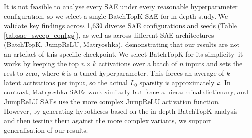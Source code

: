 It is not feasible to analyse every SAE under every reasonable hyperparameter configuration, so we select a single BatchTopK SAE for in-depth study. We validate key findings across 1,630 diverse SAE configurations and seeds (Table \ref{tab:sae_sweep_configs}), as well as across different SAE architectures (BatchTopK, JumpReLU, Matryoshka), demonstrating that our results are not an artefact of this specific checkpoint. We select BatchTopK for its simplicity: it works by keeping the top $n \times k$ activations over a batch of $n$ inputs and sets the rest to zero, where $k$ is a tuned hyperparameter. This forces an average of $k$ latent activations per input, so the actual $L_0$ sparsity is approximately $k$. In contrast, Matryoshka SAEs work similarly but force a hierarchical dictionary, and JumpReLU SAEs use the more complex JumpReLU activation function. However, by generating hypotheses based on the in-depth BatchTopK analysis and then testing them against the more complex variants, we support generalisation of our results.

